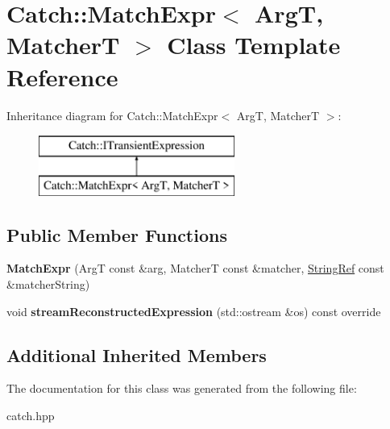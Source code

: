 \hypertarget{classCatch_1_1MatchExpr}{}\section{Catch\+::Match\+Expr$<$ ArgT, MatcherT $>$ Class Template Reference}
\label{classCatch_1_1MatchExpr}
Inheritance diagram for Catch\+::Match\+Expr$<$ ArgT, MatcherT $>$\+:\begin{figure}[H]
\begin{center}
\leavevmode
\includegraphics[height=2.000000cm]{classCatch_1_1MatchExpr}
\end{center}
\end{figure}
\subsection*{Public Member Functions}
\begin{DoxyCompactItemize}
\item 
\mbox{\label{classCatch_1_1MatchExpr_ae55ee9bf46c8676c65e9df291a98c345}} 
{\bfseries Match\+Expr} (ArgT const \&arg, MatcherT const \&matcher, \mbox{\hyperlink{classCatch_1_1StringRef}{String\+Ref}} const \&matcher\+String)
\item 
\mbox{\label{classCatch_1_1MatchExpr_ad3e41adb597750b2219bb37e51185629}} 
void {\bfseries stream\+Reconstructed\+Expression} (std\+::ostream \&os) const override
\end{DoxyCompactItemize}
\subsection*{Additional Inherited Members}


The documentation for this class was generated from the following file\+:\begin{DoxyCompactItemize}
\item 
catch.\+hpp\end{DoxyCompactItemize}
